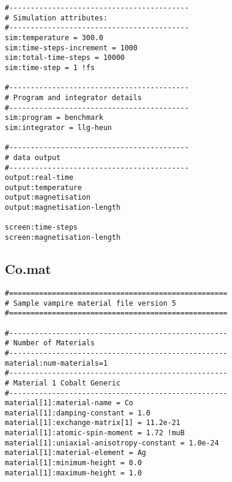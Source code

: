 {\footnotesize
\begin{verbatim}
#------------------------------------------
# Simulation attributes:
#------------------------------------------
sim:temperature = 300.0
sim:time-steps-increment = 1000
sim:total-time-steps = 10000
sim:time-step = 1 !fs

#------------------------------------------
# Program and integrator details
#------------------------------------------
sim:program = benchmark
sim:integrator = llg-heun

#------------------------------------------
# data output
#------------------------------------------
output:real-time
output:temperature
output:magnetisation
output:magnetisation-length

screen:time-steps
screen:magnetisation-length
\end{verbatim}
}

\subsection*{Co.mat}
{\footnotesize
\begin{verbatim}
#===================================================
# Sample vampire material file version 5
#===================================================

#---------------------------------------------------
# Number of Materials
#---------------------------------------------------
material:num-materials=1
#---------------------------------------------------
# Material 1 Cobalt Generic
#---------------------------------------------------
material[1]:material-name = Co
material[1]:damping-constant = 1.0
material[1]:exchange-matrix[1] = 11.2e-21
material[1]:atomic-spin-moment = 1.72 !muB
material[1]:uniaxial-anisotropy-constant = 1.0e-24
material[1]:material-element = Ag
material[1]:minimum-height = 0.0
material[1]:maximum-height = 1.0
\end{verbatim}
}


